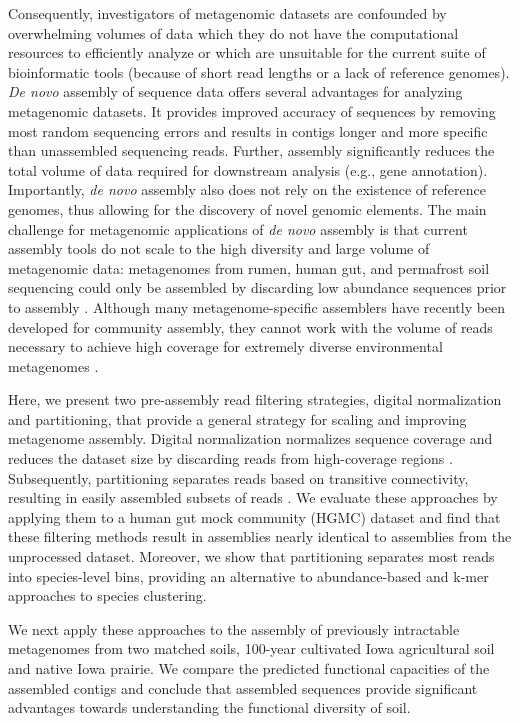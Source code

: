 \documentclass{pnastwo}
\begin{document}
\begin{article}
Consequently, investigators of metagenomic datasets are confounded by
overwhelming volumes of data which they do not have the computational resources
to efficiently analyze or which are unsuitable for the current suite of
bioinformatic tools (because of short read lengths or a lack of reference
genomes). \emph{De novo} assembly of sequence data offers several advantages for
analyzing metagenomic datasets. It provides improved accuracy of sequences by
removing most random sequencing errors and results in contigs longer and more
specific than unassembled sequencing reads. Further, assembly significantly
reduces the total volume of data required for downstream analysis (e.g., gene
annotation). Importantly, \emph{de novo} assembly also does not rely on the
existence of reference genomes, thus allowing for the discovery of novel genomic
elements. The main challenge for metagenomic applications of \emph{de novo}
assembly is that current assembly tools do not scale to the high diversity and
large volume of metagenomic data: metagenomes from rumen, human gut, and
permafrost soil sequencing could only be assembled by discarding low abundance
sequences prior to assembly
\cite{Hess:2011p686,Mackelprang:2011p1087,Qin:2010p189}. Although many
metagenome-specific assemblers have recently been developed for community
assembly, they cannot work with the volume of reads necessary to achieve high
coverage for extremely diverse environmental metagenomes
\cite{Scholz:2012p1372}.

Here, we present two pre-assembly read filtering strategies, digital
normalization and partitioning, that provide a general strategy for scaling and
improving metagenome assembly. Digital normalization normalizes sequence
coverage and reduces the dataset size by discarding reads from high-coverage
regions \cite{browndiginorm}. Subsequently, partitioning separates reads based
on transitive connectivity, resulting in easily assembled subsets of reads
\cite{howeartifacts,Pell:2012cq}. We evaluate these approaches by applying them
to a human gut mock community (HGMC) dataset and find that these filtering
methods result in assemblies nearly identical to assemblies from the unprocessed
dataset. Moreover, we show that partitioning separates most reads into
species-level bins, providing an alternative to abundance-based and k-mer
approaches to species clustering.

We next apply these approaches to the assembly of previously intractable
metagenomes from two matched soils, 100-year cultivated Iowa agricultural soil
and native Iowa prairie. We compare the predicted functional capacities of the
assembled contigs and conclude that assembled sequences provide significant
advantages towards understanding the functional diversity of soil.


\end{article}
\end{document}
